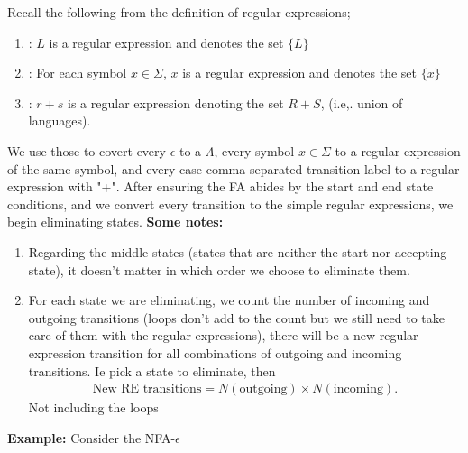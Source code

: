 \documentclass{report}
\begin{document}
\begin{itemize}
        \bigbreak \noindent 
        Recall the following from the definition of regular expressions;
        \begin{enumerate}[label=(\roman*)]
            \item {}: $L$ is a regular expression and denotes the set $\{L\}$
            \item  {}: For each symbol $x\in\Sigma$, $x$ is a regular expression and denotes the set $\{x\}$
            \item  {}: $r+s$ is a regular expression denoting the set $R + S$, (i.e,. union of languages).                       
        \end{enumerate}
        \bigbreak \noindent 
        We use those to covert every $\epsilon$ to a $\Lambda$, every symbol $x\in\Sigma$ to a regular expression of the same symbol, and every case comma-separated transition label to a regular expression with "+".
        \bigbreak \noindent 
        After ensuring the FA abides by the start and end state conditions, and we convert every transition to the simple regular expressions, we begin eliminating states.
        \bigbreak \noindent 
        \textbf{Some notes:}
        \begin{enumerate}[label=(\alph*)]
            \item Regarding the middle states (states that are neither the start nor accepting state), it doesn't matter in which order we choose to eliminate them.
            \item For each state we are eliminating, we count the number of incoming and outgoing transitions (loops don't add to the count but we still need to take care of them with the regular expressions), there will be a new regular expression transition for all combinations of outgoing and incoming transitions. Ie pick a state to eliminate, then
                \begin{align*}
                    \text{New RE transitions} = N(\text{outgoing}) \times N(\text{incoming}) 
                .\end{align*}
                Not including the loops
        \end{enumerate}
        \pagebreak \bigbreak \noindent 
        \textbf{Example:} Consider the NFA-$\epsilon$
        \bigbreak \noindent 
        \begin{figure}[ht]
            \centering
            \label{fig:re1}
        \end{figure}
        \bigbreak \noindent 

\end{itemize}
\end{document}

